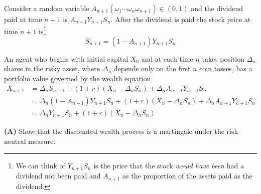 \documentclass[12pt]{article}
\newlength\tindent
\renewcommand{\indent}{\hspace*{\tindent}}
\begin{document}
\indent Consider a random variable $A_{n + 1}(\omega_1\cdots\omega_n\omega_{n + 1}) \in (0, 1)$ and the dividend paid at time $n + 1$ is $A_{n +1}Y_{n + 1}S_n$. After the dividend is paid the stock price at time $n + 1$ is\footnote{We can think of $Y_{n + 1}S_n$ is the price that the stock {\em would have been} had a dividend not been paid and $A_{n + 1}$ as the proportion of the assets paid as the dividend.}
\begin{equation*}
	S_{n + 1} = (1 - A_{n + 1})Y_{n + 1}S_n
\end{equation*}

\indent An agent who begins with initial capital $X_0$ and at each time $n$ takes position $\Delta_n$ shares in the risky asset, where $\Delta_n$ depends only on the first $n$ coin tosses, has a portfolio value governed by the wealth equation
\begin{align*}
	X_{n + 1} &= \Delta_nS_{n + 1} + (1 + r)(X_n - \Delta_nS_n) + \Delta_nA_{n + 1}Y_{n + 1}S_n \\
	&= \Delta_n(1 - A_{n + 1})Y_{n + 1}S_n + (1 + r)(X_n - \Delta_nS_n) + \Delta_nA_{n + 1}Y_{n + 1}S_n \\
	&= \Delta_nY_{n + 1}S_n + (1 + r)(X_n - \Delta_nS_n)
\end{align*}

{\bf (A)} Show that the discounted wealth process is a martingale under the risk-neutral measure. \\
\end{document}
